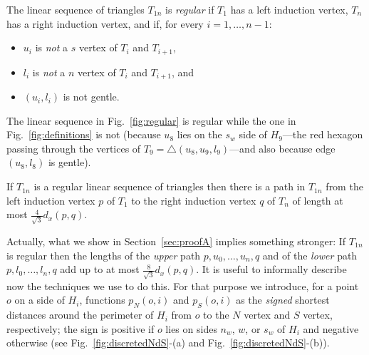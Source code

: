 \begin{definition}
The linear sequence of triangles $T_{1n}$ is {\em regular} if $T_1$ has a left
induction vertex, $T_n$ has a right induction vertex, and if, for
every $i = 1, \dots, n-1$:
\begin{itemize}
\item $u_i$ is {\em not} a $s$ vertex of $T_i$ and $T_{i+1}$,
\item $l_i$ is {\em not} a $n$ vertex of $T_i$ and $T_{i+1}$, and 
\item $(u_i,l_i)$ is not gentle.
\end{itemize} 
\end{definition}
The linear sequence in Fig.~\ref{fig:regular} is regular while the one in
Fig.~\ref{fig:definitions} is not (because $u_8$ lies on the $s_w$ side of
$H_9$---the red hexagon passing through the vertices of
$T_9 = \triangle(u_8, u_9, l_9)$---and also because edge $(u_8,l_8)$ is gentle). 

\iftoggle{abstract}
{The proof of the following technical lemma is discussed in Section~\ref{sec:proofA}.}
{The following technical lemma is proven in Section~\ref{sec:proofA}.}
\begin{lemma}
\label{le:mainlemmaA}
If $T_{1n}$ is a regular linear sequence of triangles then there is a path in
$T_{1n}$ from
the left induction vertex $p$ of $T_1$ to the right induction vertex $q$ of
$T_n$ of length at most  $\frac{4}{\sqrt{3}} d_x(p,q)$.
\end{lemma}

Actually, what we show in Section~\ref{sec:proofA} implies something stronger: 
If $T_{1n}$ is regular then the lengths of the {\em upper} path 
$p,u_0,\dots,u_n,q$ and of the {\em lower} path $p,l_0,\dots,l_n,q$ 
add up to at most $\frac{8}{\sqrt{3}} d_x(p,q)$. 
It is useful to informally describe now the techniques we use to do this. For
that purpose we introduce, for a point $o$ on a side of $H_i$, functions
$p_N(o,i)$ and $p_S(o,i)$ as the {\em signed} shortest distances around the
perimeter of $H_i$ from $o$ to the $N$ vertex and $S$ vertex, respectively;
the sign is positive if $o$ lies on sides
$n_w$, $w$, or $s_w$ of $H_i$ and negative otherwise 
(see Fig.~\ref{fig:discretedNdS}-(a) and Fig.~\ref{fig:discretedNdS}-(b)).

